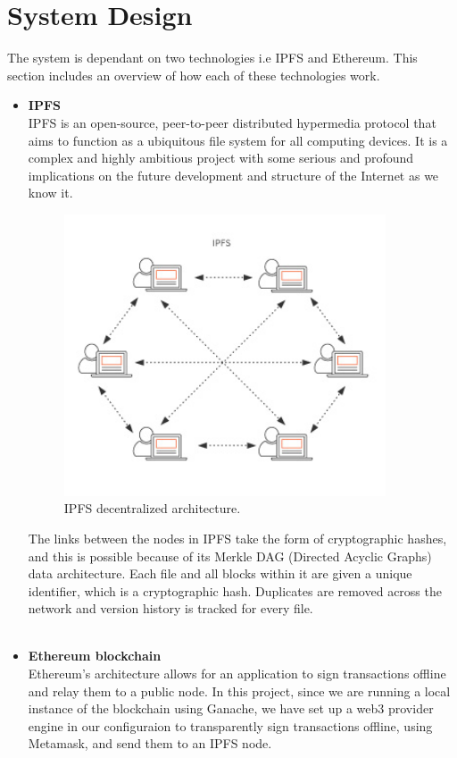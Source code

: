 \section{System Design}
The system is dependant on two technologies i.e IPFS and Ethereum. This section includes an overview of how each of these technologies work.
\begin{itemize}
\item\textbf{IPFS}\\
IPFS is an open-source, peer-to-peer distributed hypermedia protocol that aims to function as a ubiquitous file system for all computing devices. It is a complex and highly ambitious project with some serious and profound implications on the future development and structure of the Internet as we know it.\\
\begin{figure}[H]
  \caption{IPFS decentralized architecture.}
  \centering
  \includegraphics[width=0.9\textwidth]{images/IPFS.png}
\end{figure}
The links between the nodes in IPFS take the form of cryptographic hashes, and this is possible because of its Merkle DAG\cite{art20} (Directed Acyclic Graphs) data architecture. Each file and all blocks within it are given a unique identifier, which is a cryptographic hash. Duplicates are removed across the network and version history is tracked for every file.\\\\
\item\textbf{Ethereum blockchain}\\
Ethereum's architecture allows for an application to sign transactions offline and relay them to a public node. In this project, since we are running a local instance of the blockchain using Ganache, we have set up a web3 provider engine in our configuraion to transparently sign transactions offline, using Metamask, and send them to an IPFS node.

\end{itemize}
